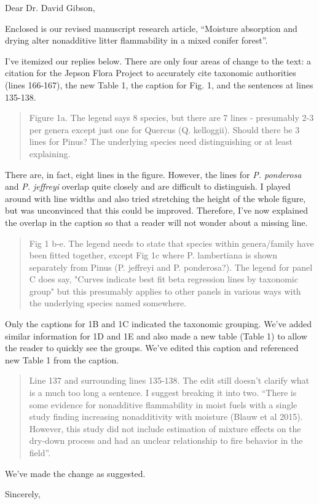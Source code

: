 \documentclass[letterpaper, 12pt]{letter}
\begin{document}
\begin{letter}{}

\opening{Dear Dr. David Gibson,}

Enclosed is our revised manuscript research article, ``Moisture absorption and
drying alter nonadditive litter flammability in a mixed conifer forest''.

I've itemized our replies below. There are only four areas of change to
the text: a citation for the Jepson Flora Project to accurately cite taxonomic
authorities (lines 166-167), the new Table 1, the caption for Fig. 1, and the
sentences at lines 135-138.

\begin{quote}
  Figure 1a. The legend says 8 species, but there are 7 lines - presumably 2-3
per genera except just one for Quercus (Q. kelloggii). Should there be 3 lines
for Pinus? The underlying species need distinguishing or at least explaining.
\end{quote}

There are, in fact, eight lines in the figure. However, the lines for \emph{P. ponderosa} and \emph{P. jeffreyi} overlap quite closely and are difficult to distinguish. I played around with line widths and also tried stretching the height of the whole figure, but was unconvinced that this could be improved. Therefore, I've now explained the overlap in the caption so that a reader will not wonder about a missing line.
  

\begin{quote}
  Fig 1 b-e. The legend needs to state that species within genera/family have
been fitted together, except Fig 1c where P. lambertiana is shown separately
from Pinus (P. jeffreyi and P. ponderosa?). The legend for panel C does say,
"Curves indicate best fit beta regression lines by taxonomic group" but this
presumably applies to other panels in various ways with the underlying species
named somewhere.
\end{quote}

Only the captions for 1B and 1C indicated the taxonomic grouping. We've added similar information for 1D and 1E and
also made a new table (Table 1) to allow the reader to quickly see the
groups. We've edited this caption and referenced new Table 1 from the caption.


\begin{quote}
Line 137 and surrounding lines 135-138. The edit still doesn't clarify what is
a much too long a sentence. I suggest breaking it into two. ``There is some
evidence for nonadditive flammability in moist fuels with a single study
finding increasing nonadditivity with moisture (Blauw et al 2015). However,
this study did not include estimation of mixture effects on the dry-down
process and had an unclear relationship to fire behavior in the field''.
\end{quote}

We've made the change as suggested.


\closing{Sincerely,}

\end{letter}
\end{document}
